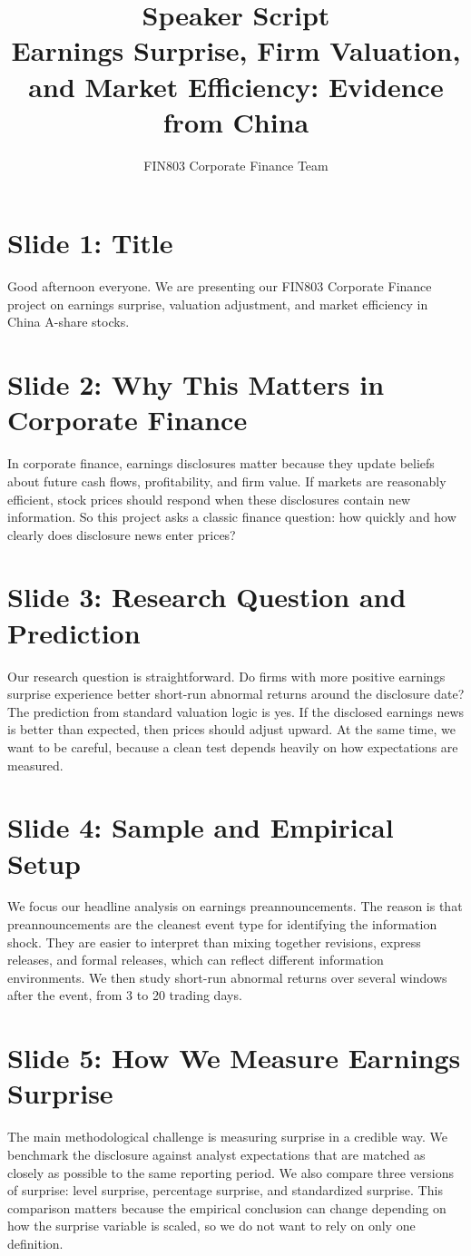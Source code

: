 \documentclass[11pt,a4paper]{article}
\title{Speaker Script\\Earnings Surprise, Firm Valuation, and Market Efficiency: Evidence from China}
\author{FIN803 Corporate Finance Team}
\date{}
\begin{document}
\maketitle

\section*{Slide 1: Title}
Good afternoon everyone. We are presenting our FIN803 Corporate Finance project on earnings surprise, valuation adjustment, and market efficiency in China A-share stocks.

\section*{Slide 2: Why This Matters in Corporate Finance}
In corporate finance, earnings disclosures matter because they update beliefs about future cash flows, profitability, and firm value. If markets are reasonably efficient, stock prices should respond when these disclosures contain new information. So this project asks a classic finance question: how quickly and how clearly does disclosure news enter prices?

\section*{Slide 3: Research Question and Prediction}
Our research question is straightforward. Do firms with more positive earnings surprise experience better short-run abnormal returns around the disclosure date? The prediction from standard valuation logic is yes. If the disclosed earnings news is better than expected, then prices should adjust upward. At the same time, we want to be careful, because a clean test depends heavily on how expectations are measured.

\section*{Slide 4: Sample and Empirical Setup}
We focus our headline analysis on earnings preannouncements. The reason is that preannouncements are the cleanest event type for identifying the information shock. They are easier to interpret than mixing together revisions, express releases, and formal releases, which can reflect different information environments. We then study short-run abnormal returns over several windows after the event, from 3 to 20 trading days.

\section*{Slide 5: How We Measure Earnings Surprise}
The main methodological challenge is measuring surprise in a credible way. We benchmark the disclosure against analyst expectations that are matched as closely as possible to the same reporting period. We also compare three versions of surprise: level surprise, percentage surprise, and standardized surprise. This comparison matters because the empirical conclusion can change depending on how the surprise variable is scaled, so we do not want to rely on only one definition.
\end{document}
